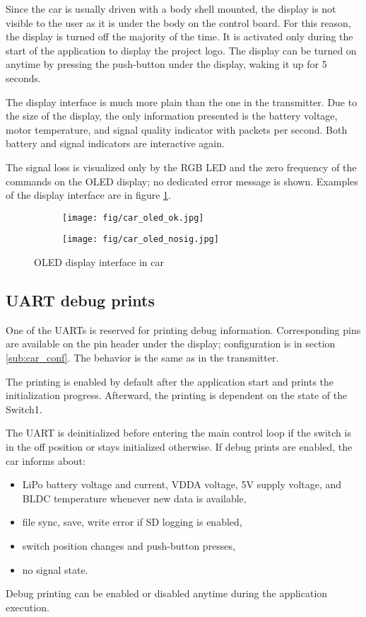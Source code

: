 Since the car is usually driven with a body shell mounted, the display is not visible to the user as it is under the body on the control board. For this reason, the display is turned off the majority of the time. It is activated only during the start of the application to display the project logo. The display can be turned on anytime by pressing the push-button under the display, waking it up for 5 seconds.

The display interface is much more plain than the one in the transmitter. 
Due to the size of the display, the only information presented is the battery voltage, motor temperature, and signal quality indicator with packets per second. Both battery and signal indicators are interactive again.

The signal loss is visualized only by the RGB LED and the zero frequency of the commands on the OLED display; no dedicated error message is shown. Examples of the display interface are in figure \ref{fig:car_oled}.
\begin{figure}[t]
    \centering
    \begin{subfigure}{0.4\textwidth}
    \centering
        \texttt{[image: fig/car\_oled\_ok.jpg]}
    \end{subfigure}%
    \hspace{1cm}
    \begin{subfigure}{0.4\textwidth}
    \centering
		\texttt{[image: fig/car\_oled\_nosig.jpg]}
    \end{subfigure}
	\caption{OLED display interface in car}
    \label{fig:car_oled}
\end{figure}

\subsection{UART debug prints}
One of the UARTs is reserved for printing debug information. Corresponding pins are available on the pin header under the display; configuration is in section \ref{sub:car_conf}. The behavior is the same as in the transmitter.

The printing is enabled by default after the application start and prints the initialization progress. Afterward, the printing is dependent on the state of the Switch1.

The UART is deinitialized before entering the main control loop if the switch is in the off position or stays initialized otherwise. If debug prints are enabled, the car informs about:
\begin{itemize}
\item LiPo battery voltage and current, VDDA voltage, 5V supply voltage, and BLDC temperature whenever new data is available,
\item file sync, save, write error if SD logging is enabled,
\item switch position changes and push-button presses,
\item no signal state.
\end{itemize}
Debug printing can be enabled or disabled anytime during the application execution.
